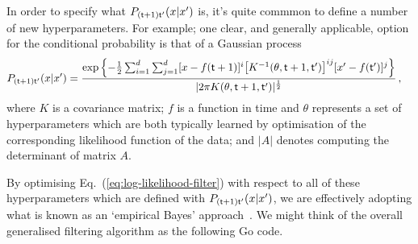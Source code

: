 In order to specify what $P_{({\sf t}+1){\sf t}'}(x\vert x')$ is, it's quite commmon to define a number of new hyperparameters. For example; one clear, and generally applicable, option for the conditional probability is that of a Gaussian process 
\begin{align}
P_{({\sf t}+1){\sf t}'}(x\vert x') &= \frac{{\rm exp}\left\{ -\frac{1}{2}\sum^d_{i=1}\sum^d_{j=1}[x-f({\sf t}+1)]^i \big[ K^{-1}(\theta , {\sf t}+1,{\sf t}')\big]^{ij}[x'-f({\sf t}')]^j  \right\}}{\vert 2\pi K(\theta , {\sf t}+1,{\sf t}') \vert^{\frac{1}{2}}} \label{eq:gaussian-process-cond-prob}\,,
\end{align}
where $K$ is a covariance matrix; $f$ is a function in time and $\theta$ represents a set of hyperparameters which are both typically learned by optimisation of the corresponding likelihood function of the data; and $\vert A\vert$ denotes computing the determinant of matrix $A$. 

By optimising Eq.~(\ref{eq:log-likelihood-filter}) with respect to all of these hyperparameters which are defined with $P_{({\sf t}+1){\sf t}'}(x\vert x')$, we are effectively adopting what is known as an `empirical Bayes' approach~\cite{murphy2012machine, mackay2003information}. We might think of the overall generalised filtering algorithm as the following Go code.

